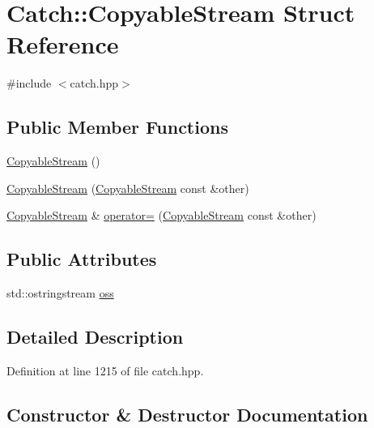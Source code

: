 \hypertarget{struct_catch_1_1_copyable_stream}{}\section{Catch\+:\+:Copyable\+Stream Struct Reference}
\label{struct_catch_1_1_copyable_stream}


{\ttfamily \#include $<$catch.\+hpp$>$}

\subsection*{Public Member Functions}
\begin{DoxyCompactItemize}
\item 
\hyperlink{struct_catch_1_1_copyable_stream_a5a61d0da675ae00cd46efaef4c445cdd}{Copyable\+Stream} ()
\item 
\hyperlink{struct_catch_1_1_copyable_stream_a0e72dc16240653f52c17106f4bf34da8}{Copyable\+Stream} (\hyperlink{struct_catch_1_1_copyable_stream}{Copyable\+Stream} const \&other)
\item 
\hyperlink{struct_catch_1_1_copyable_stream}{Copyable\+Stream} \& \hyperlink{struct_catch_1_1_copyable_stream_a1760fa29b38011c5845171260bec0966}{operator=} (\hyperlink{struct_catch_1_1_copyable_stream}{Copyable\+Stream} const \&other)
\end{DoxyCompactItemize}
\subsection*{Public Attributes}
\begin{DoxyCompactItemize}
\item 
std\+::ostringstream \hyperlink{struct_catch_1_1_copyable_stream_ae123fb4d673e7d7a13a3c5f6bc5d426c}{oss}
\end{DoxyCompactItemize}


\subsection{Detailed Description}


Definition at line 1215 of file catch.\+hpp.



\subsection{Constructor \& Destructor Documentation}
\hypertarget{struct_catch_1_1_copyable_stream_a5a61d0da675ae00cd46efaef4c445cdd}{}\label{struct_catch_1_1_copyable_stream_a5a61d0da675ae00cd46efaef4c445cdd} 
